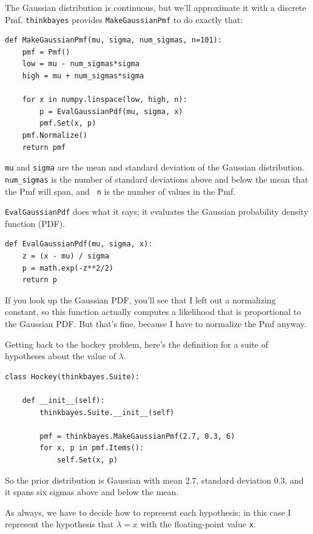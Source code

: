 \documentclass[12pt]{book}
\begin{document}
The Gaussian distribution is continuous, but we'll approximate it with
a discrete Pmf.  \verb"thinkbayes" provides \verb"MakeGaussianPmf" to
do exactly that:

\begin{verbatim}
def MakeGaussianPmf(mu, sigma, num_sigmas, n=101):
    pmf = Pmf()
    low = mu - num_sigmas*sigma
    high = mu + num_sigmas*sigma

    for x in numpy.linspace(low, high, n):
        p = EvalGaussianPdf(mu, sigma, x)
        pmf.Set(x, p)
    pmf.Normalize()
    return pmf
\end{verbatim}  

{\tt mu} and {\tt sigma} are the mean and standard deviation of the
Gaussian distribution.  \verb"num_sigmas" is the number of standard
deviations above and below the mean that the Pmf will span, and {\tt
  n} is the number of values in the Pmf.

\verb"EvalGaussianPdf" does what it says; it evaluates the
Gaussian probability density function (PDF).

\begin{verbatim}
def EvalGaussianPdf(mu, sigma, x):
    z = (x - mu) / sigma
    p = math.exp(-z**2/2)
    return p
\end{verbatim}  

If you look up the Gaussian PDF, you'll see that I left out a
normalizing constant, so this function actually computes
a likelihood that is proportional to the Gaussian PDF.  But
that's fine, because I have to normalize the Pmf anyway.

Getting back to the hockey problem, here's the definition for a suite
of hypotheses about the value of $\lambda$.

\begin{verbatim}
class Hockey(thinkbayes.Suite):

    def __init__(self):
        thinkbayes.Suite.__init__(self)

        pmf = thinkbayes.MakeGaussianPmf(2.7, 0.3, 6)
        for x, p in pmf.Items():
            self.Set(x, p)
\end{verbatim}  

So the prior distribution is Gaussian with mean 2.7, standard deviation
0.3, and it spans six sigmas above and below the mean.

As always, we have to decide how to represent each hypothesis; in
this case I represent the hypothesis that $\lambda=x$ with the
floating-point value {\tt x}. 
\end{document}
